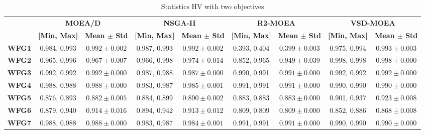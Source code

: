 \begin{table*}[t]
\caption{Statistics HV with two objectives}
\label{tab:StatisticsHV_2obj}
\begin{tabular}{c|c|c|c|c|c|c|c|c|}
\cline{2-9}
                                     & \multicolumn{2}{c|}{\textbf{MOEA/D}}              & \multicolumn{2}{c|}{\textbf{NSGA-II}}             & \multicolumn{2}{c|}{\textbf{R2-MOEA}}             & \multicolumn{2}{c|}{\textbf{VSD-MOEA}}            \\ \cline{2-9} 
                                     & \textbf{{[}Min, Max{]}} & \textbf{Mean $\pm$ Std} & \textbf{{[}Min, Max{]}} & \textbf{Mean $\pm$ Std} & \textbf{{[}Min, Max{]}} & \textbf{Mean $\pm$ Std} & \textbf{{[}Min, Max{]}} & \textbf{Mean $\pm$ Std} \\ \hline
\multicolumn{1}{|c|}{\textbf{WFG1}}  & 0.984, 0.993            & $0.992 \pm 0.002$       & 0.987, 0.993            & $0.992 \pm 0.002$       & 0.393, 0.404            & $0.399 \pm 0.003$       & 0.975, 0.994            & $0.993 \pm 0.003$       \\ \hline
\multicolumn{1}{|c|}{\textbf{WFG2}}  & 0.965, 0.996            & $0.967 \pm 0.007$       & 0.966, 0.998            & $0.974 \pm 0.014$       & 0.852, 0.965            & $0.949 \pm 0.039$       & 0.998, 0.998            & $0.998 \pm 0.000$       \\ \hline
\multicolumn{1}{|c|}{\textbf{WFG3}}  & 0.992, 0.992            & $0.992 \pm 0.000$       & 0.987, 0.988            & $0.987 \pm 0.000$       & 0.990, 0.991            & $0.991 \pm 0.000$       & 0.992, 0.992            & $0.992 \pm 0.000$       \\ \hline
\multicolumn{1}{|c|}{\textbf{WFG4}}  & 0.988, 0.988            & $0.988 \pm 0.000$       & 0.983, 0.987            & $0.985 \pm 0.001$       & 0.991, 0.991            & $0.991 \pm 0.000$       & 0.990, 0.990            & $0.990 \pm 0.000$       \\ \hline
\multicolumn{1}{|c|}{\textbf{WFG5}}  & 0.876, 0.893            & $0.882 \pm 0.005$       & 0.884, 0.899            & $0.890 \pm 0.002$       & 0.883, 0.883            & $0.883 \pm 0.000$       & 0.901, 0.937            & $0.923 \pm 0.008$       \\ \hline
\multicolumn{1}{|c|}{\textbf{WFG6}}  & 0.879, 0.940            & $0.914 \pm 0.016$       & 0.894, 0.942            & $0.913 \pm 0.012$       & 0.809, 0.809            & $0.809 \pm 0.000$       & 0.852, 0.886            & $0.868 \pm 0.008$       \\ \hline
\multicolumn{1}{|c|}{\textbf{WFG7}}  & 0.988, 0.988            & $0.988 \pm 0.000$       & 0.983, 0.987            & $0.984 \pm 0.001$       & 0.991, 0.991            & $0.991 \pm 0.000$       & 0.990, 0.990            & $0.990 \pm 0.000$       \\ \hline

\end{tabular}
\end{table*}
